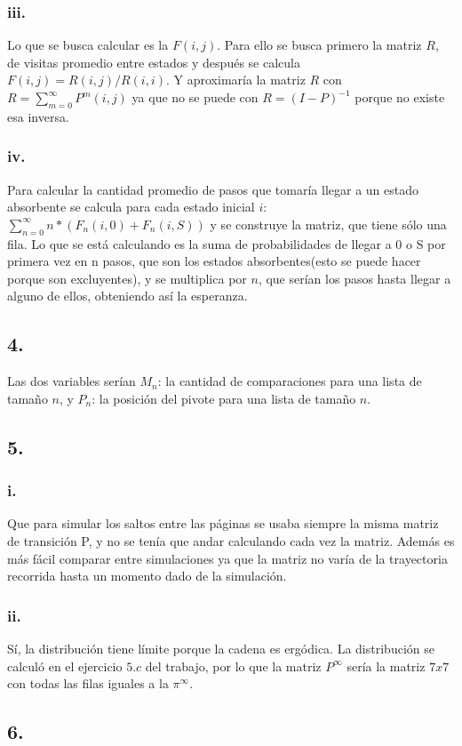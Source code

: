 \documentclass[12pt,fleqn]{article}
\begin{document}
\subsubsection*{iii.}
Lo que se busca calcular es la $F(i,j)$. Para ello se busca primero la matriz $R$, de visitas promedio entre estados y después se calcula $F(i,j)=R(i,j)/R(i,i)$. Y aproximaría la matriz $R$ con $R=\sum_{m=0}^\infty P^m(i,j)$ ya que no se puede con $R=(I-P)^{-1}$ porque no existe esa inversa.
\subsubsection*{iv.}
Para calcular la cantidad promedio de pasos que tomaría llegar a un estado absorbente se calcula para cada estado inicial $i$: $\sum_{n=0}^\infty n*(F_n(i,0)+F_n(i,S))$ y se construye la matriz, que tiene sólo una fila. Lo que se está calculando es la suma de probabilidades de llegar a 0 o S por primera vez en n pasos, que son los estados absorbentes(esto se puede hacer porque son excluyentes), y se multiplica por $n$, que serían los pasos hasta llegar a alguno de ellos, obteniendo así la esperanza.
\subsection*{4.}
Las dos variables serían $M_n$: la cantidad de comparaciones para una lista de tamaño $n$, y $P_n$: la posición del pivote para una lista de tamaño $n$.
\subsection*{5.}
\subsubsection*{i.}
Que para simular los saltos entre las páginas se usaba siempre la misma matriz de transición P, y no se tenía que andar calculando cada vez la matriz. Además es más fácil comparar entre simulaciones ya que la matriz no varía de la trayectoria recorrida hasta un momento dado de la simulación.
\subsubsection*{ii.}
Sí, la distribución tiene límite porque la cadena es ergódica. La distribución se calculó en el ejercicio $5.c$ del trabajo, por lo que la matriz $P^\infty$ sería la matriz $7x7$ con todas las filas iguales a la $\pi^\infty$.
\subsection*{6.}
\end{document}
